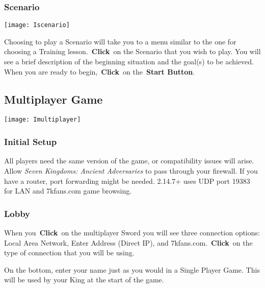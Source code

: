 \subsubsection{Scenario}


\begin{center}
	\texttt{[image: Iscenario]}
\end{center}

Choosing to play a Scenario will take you to a menu similar to the one for choosing a Training lesson. \textbf{Click} on the Scenario that you wish to play. You will see a brief description of the beginning situation and the goal(s) to be achieved. When you are ready to begin, \textbf{Click} on the \textbf{Start Button}.

\subsection{Multiplayer Game}


\begin{center}
	\texttt{[image: Imultiplayer]}
\end{center}

\subsubsection{Initial Setup}


All players need the same version of the game, or compatibility issues will arise. Allow \textit{Seven Kingdoms: Ancient Adversaries} to pass through your firewall. If you have a router, port forwarding might be needed. 2.14.7+ uses UDP port 19383 for LAN and 7kfans.com game browsing.

\subsubsection{Lobby}

When you \textbf{Click} on the multiplayer Sword you will see three connection options: Local Area Network, Enter Address (Direct IP), and 7kfans.com. \textbf{Click} on the type of connection that you will be using.

On the bottom, enter your name just as you would in a Single Player Game. This will be used by your King at the start of the game.

